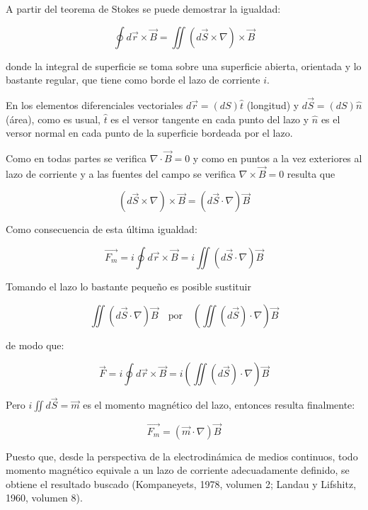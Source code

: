 A partir del teorema de Stokes se puede demostrar la igualdad: 

\begin{equation*}
\oint d\overrightarrow{r}\times\overrightarrow{B}=\iint (d\overrightarrow{S}\times \nabla)\times\overrightarrow{B}
\end{equation*}

donde la integral de superficie se toma sobre una superficie abierta, orientada y lo bastante regular, que tiene como borde el lazo de corriente $i$. 

En los elementos diferenciales vectoriales $d\overrightarrow{r}=(dS)\hat{t}$ (longitud) y $d\overrightarrow{S}=(dS)\hat{n}$ (área), como es usual, $\hat{t}$ es el versor tangente en cada punto del lazo y $\hat{n}$ es el versor normal en cada punto de la superficie bordeada por el lazo. 

Como en todas partes se verifica $\nabla\cdot\overrightarrow{B}=0$ y como en puntos a la vez exteriores al lazo de corriente y a las fuentes del campo se verifica $\nabla \times \overrightarrow{B} = 0$ resulta que 

\begin{equation*}
(d\overrightarrow{S} \times \nabla ) \times \overrightarrow{B} = (d\overrightarrow{S} \cdot \nabla ) \overrightarrow{B}
\end{equation*} 

Como consecuencia de esta última igualdad: 

\begin{equation*}
\overrightarrow{F_{m}}=i\oint d\overrightarrow{r}\times\overrightarrow{B} = i \iint (d\overrightarrow{S} \cdot \nabla)\overrightarrow{B}
\end{equation*}

Tomando el lazo lo bastante pequeño es posible sustituir 

\begin{equation*}
\iint (d\overrightarrow{S} \cdot \nabla)\overrightarrow{B}\quad \text{por}\quad \left( \iint (d\overrightarrow{S}) \cdot \nabla\right) \overrightarrow{B}
\end{equation*}

de modo que: 

\begin{equation*}
\overrightarrow{F}=i\oint d\overrightarrow{r} \times \overrightarrow{B} = i \left( \iint (d\overrightarrow{S}) \cdot \nabla\right) \overrightarrow{B} 
\end{equation*}


Pero $i\iint d\overrightarrow{S} = \overrightarrow{m}$ es el momento magnético del lazo, entonces resulta finalmente: 

\begin{equation*}
\overrightarrow{F_{m}}=(\overrightarrow{m}\cdot\nabla)\overrightarrow{B} 
\end{equation*}

Puesto que, desde la perspectiva de la electrodinámica de medios continuos, todo momento magnético equivale a un lazo de corriente adecuadamente definido, se obtiene el resultado buscado (Kompaneyets, 1978, volumen 2; Landau y Lifshitz, 1960, volumen 8).